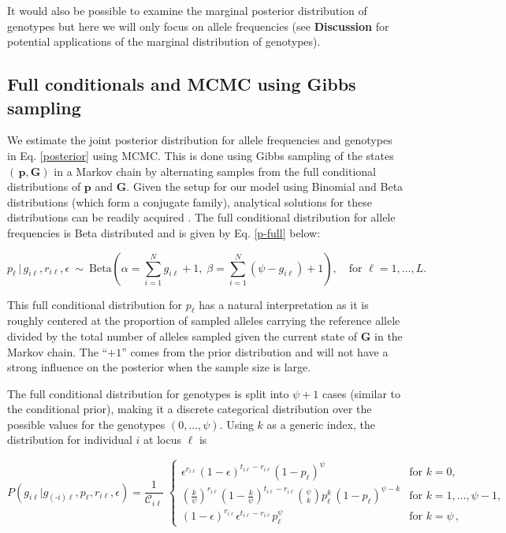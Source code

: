 \documentclass[11pt,english,letterpaper,oneside]{article}
\begin{document}
\noindent It would also be possible to examine the marginal posterior distribution of genotypes but here we will only focus on allele frequencies (see \textbf{Discussion} for potential applications of the marginal distribution of genotypes).

\medskip
\subsection*{Full conditionals and MCMC using Gibbs sampling}
\medskip

\noindent We estimate the joint posterior distribution for allele frequencies and genotypes in Eq. \ref{posterior} using MCMC. This is done using Gibbs sampling of the states $(\,\bm{p},\bm{G})$ in a Markov chain by alternating samples from the full conditional distributions of $\bm{p}$ and $\bm{G}$. Given the setup for our model using Binomial and Beta distributions (which form a conjugate family), analytical solutions for these distributions can be readily acquired \citep{gelman2014bayesian}. The full conditional distribution for allele frequencies is Beta distributed and is given by Eq. \ref{p-full} below:

\begin{equation}\label{p-full}
p_{\ell}\,|\,g_{i \ell},r_{i \ell},\epsilon \: \sim \: \text{Beta}\left(\alpha= \sum_{i=1}^N g_{i \ell} +1,\; \beta = \sum_{i=1}^N (\psi-g_{i \ell})+1\right),\quad \text{for } \ell = 1,\ldots,L.
\end{equation}

\noindent This full conditional distribution for $p_{\ell}$ has a natural interpretation as it is roughly centered at the proportion of sampled alleles carrying the reference allele divided by the total number of alleles sampled given the current state of $\bm{G}$ in the Markov chain. The ``$+1$'' comes from the prior distribution and will not have a strong influence on the posterior when the sample size is large.
\medskip

The full conditional distribution for genotypes is split into $\psi+1$ cases (similar to the conditional prior), making it a discrete categorical distribution over the possible values for the genotypes $(0,\ldots,\psi)$. Using $k$ as a generic index, the distribution for individual $i$ at locus $\ell$ is

\begin{equation}\label{G-full}
P(g_{i \ell}|g_{(\text{-}i) \ell},p_{\ell},r_{i \ell},\epsilon) = \frac{1}{\mathcal{C}_{i \ell}} \;
	\begin{cases}
	\epsilon^{r_{i \ell}}(1-\epsilon)^{t_{i \ell}-r_{i \ell}}(1-p_{\ell})^\psi & \text{for  } k = 0, \\[0.05in]
	\left(\frac{k}{\psi}\right)^{r_{i \ell}}\left(1-\frac{k}{\psi}\right)^{t_{i \ell}-r_{i \ell}}\displaystyle\binom{\psi}{k}p_{\ell}^{k}\,(1-p_{\ell})^{\psi-k} & \text{for  } k = 1,\ldots,\psi-1, \\[0.05in]
	(1-\epsilon)^{r_{i \ell}}\epsilon^{t_{i \ell}-r_{i \ell}}p_{\ell}^\psi & \text{for  } k = \psi\,,
	\end{cases} 
\end{equation}
\end{document}
